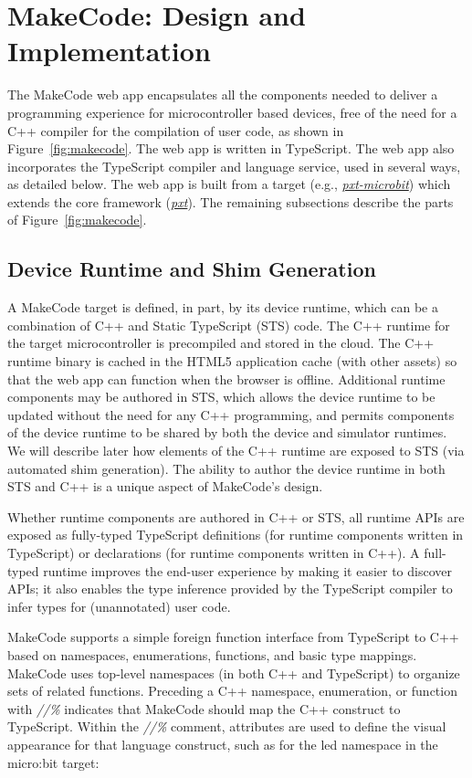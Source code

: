 \section{MakeCode: Design and Implementation}
\label{sec:makecode}

The MakeCode web app encapsulates all the components needed to deliver a programming experience 
for microcontroller based devices, free of the need for a C++ compiler for the compilation of user 
code, as shown in Figure~\ref{fig:makecode}. 
The web app is written in TypeScript. The web app also incorporates the TypeScript compiler and 
language service, used in several ways, as detailed below. 
The web app is built from a target (e.g., \emph{\href{https://github.com/microsoft/pxt-microbit}{pxt-microbit}})
which extends the core framework (\emph{\href{https://github.com/microsoft/pxt}{pxt}}).
The remaining subsections describe the parts of Figure~\ref{fig:makecode}.

\subsection{Device Runtime and Shim Generation}

A MakeCode target is defined, in part, by its device runtime, which can be a combination of C++ 
and Static TypeScript (STS) code. The C++ runtime for the target microcontroller is precompiled 
and stored in the cloud. The C++ runtime binary is cached in the HTML5 application cache (with 
other assets) so that the web app can function when the browser is offline. Additional runtime
components may be authored in STS, which allows the device runtime to be updated without the need
for any C++ programming, and permits components of the device runtime to be shared by both the device
and simulator runtimes.  We will describe later how elements of the C++ runtime are exposed to STS
(via automated shim generation). The ability to author the device runtime in both STS and C++ is
a unique aspect of MakeCode's design.

Whether runtime components are authored in C++ or STS, all runtime APIs are exposed as fully-typed
TypeScript definitions (for runtime components written in TypeScript) or declarations (for runtime
components written in C++). A full-typed runtime improves the end-user experience by making it easier
to discover APIs; it also enables the type inference provided by the TypeScript compiler to infer types
for (unannotated) user code.

MakeCode supports a simple foreign function interface from TypeScript to C++ based on namespaces,
enumerations, functions, and basic type mappings. MakeCode uses top-level namespaces (in both C++ and
TypeScript) to organize sets of related functions.  Preceding a C++ namespace, enumeration, or function
with \emph{//\%} indicates that MakeCode should map the C++ construct to TypeScript.
Within the \emph{//\%} comment, attributes are used to define the visual appearance for that
language construct, such as for the led namespace in the micro:bit target:


